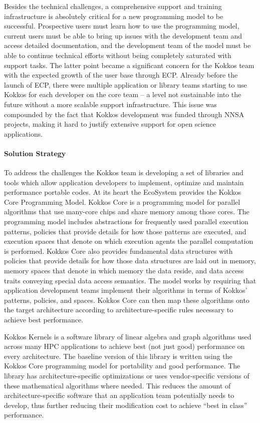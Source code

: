 Besides the technical challenges, 
a comprehensive support and training infrastructure is absolutely critical for a new programming model to be successful.
Prospective users must learn how to use the programming model, current users must be able to bring up issues with the development team and access detailed documentation, and the development team of the model must be able to continue technical efforts without being completely saturated with support tasks. 
The latter point became a significant concern for the Kokkos team with the expected growth of the user base through ECP.  
Already before the launch of ECP, there were multiple application or library teams starting to use Kokkos for each developer on the core team -- a level not sustainable into the future without a more scalable support infrastructure. 
This issue was compounded by the fact that Kokkos development was funded through NNSA projects, making it hard to justify extensive support for open science applications. 

\paragraph{Solution Strategy}

To address the challenges the Kokkos team is developing a set of libraries and tools which allow application developers to implement, optimize and maintain performance portable codes. 
At its heart the EcoSystem provides the Kokkos Core Programming Model.
Kokkos Core is a programming model for parallel algorithms that use many-core chips and share memory among those cores.
The programming model includes abstractions for frequently used parallel execution patterns, policies that provide details for how those patterns are executed, and execution spaces that denote on which execution agents the parallel computation is performed. 
Kokkos Core also provides fundamental data structures with policies that provide details for how those data structures are laid out in memory, memory spaces that denote in which memory the data reside, and data access traits conveying special data access semantics.
The model works by requiring that application development teams implement their algorithms in terms of Kokkos’ patterns, policies, and spaces. 
Kokkos Core can then map these algorithms onto the target architecture according to architecture-specific rules necessary to achieve best performance.

Kokkos Kernels is a software library of linear algebra and graph algorithms used across many HPC applications to achieve best (not just good) performance on every architecture. The baseline version of this library is written using the Kokkos Core programming model for portability and good performance. The library has architecture-specific optimizations or uses vendor-specific versions of these mathematical algorithms where needed. This reduces the amount of architecture-specific software that an application team potentially needs to develop, thus further reducing their modification cost to achieve “best in class” performance. 

